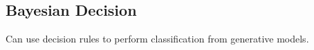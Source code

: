 \subsection{Bayesian Decision}

Can use decision rules to perform classification from generative models.